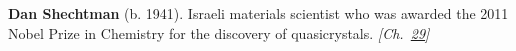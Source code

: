 \nobelchemistry \textbf{Dan Shechtman} (b. 1941). Israeli materials scientist who was awarded the 2011 Nobel Prize in Chemistry for the discovery of quasicrystals. \emph{[Ch.~\hyperref[ch:hatmonotile]{29}]}

